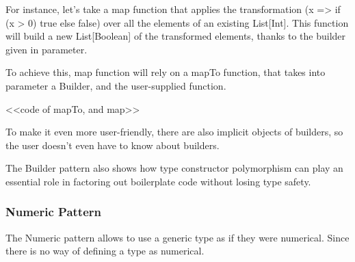 For instance, let's take a map function that applies the transformation (x =>
if (x > 0) true else false) over all the elements of an existing List[Int]. This
function will build a new List[Boolean] of the transformed elements, thanks to
the builder given in parameter.

To achieve this, map function will rely on a mapTo function, that takes into
parameter a Builder, and the user-supplied function.

<<code of mapTo, and map>>


To make it even more user-friendly, there are also implicit objects of
builders, so the user doesn't even have to know about builders.

The Builder pattern also shows how type constructor polymorphism can play an
essential role in factoring out boilerplate code without losing type safety.\cite{adriaan}

\subsubsection{Numeric Pattern}

The Numeric pattern allows to use a generic type as if they were numerical.
Since there is no way of defining a type as numerical.
